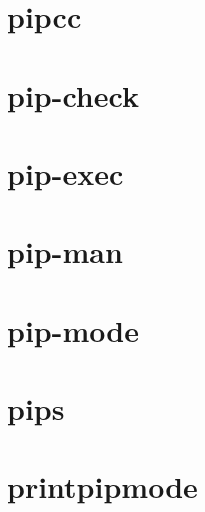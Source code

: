 
\section{pipcc}

\section{pip-check}

\section{pip-exec}

\section{pip-man}

\section{pip-mode}

\section{pips}

\section{printpipmode}

